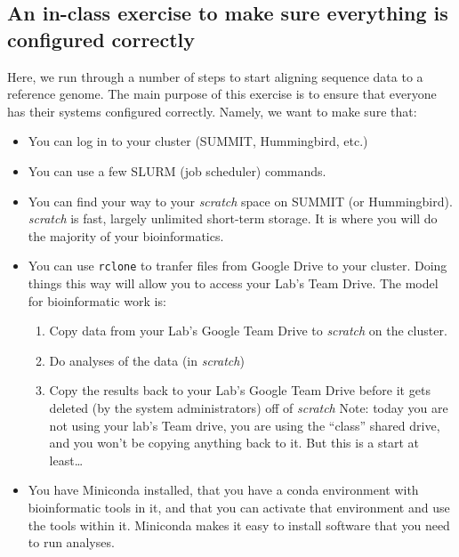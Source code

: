 \documentclass[]{krantz}
\providecommand{\tightlist}{%
  \setlength{\itemsep}{0pt}\setlength{\parskip}{0pt}}
\begin{document}
\hypertarget{an-in-class-exercise-to-make-sure-everything-is-configured-correctly}{%
\subsection{An in-class exercise to make sure everything is configured correctly}\label{an-in-class-exercise-to-make-sure-everything-is-configured-correctly}}

Here, we run through a number of steps to start aligning sequence data to a reference
genome. The main purpose of this exercise is to ensure that everyone has their systems
configured correctly. Namely, we want to make sure that:

\begin{itemize}
\tightlist
\item
  You can log in to your cluster (SUMMIT, Hummingbird, etc.)
\item
  You can use a few SLURM (job scheduler) commands.
\item
  You can find your way to your \emph{scratch} space on SUMMIT (or Hummingbird). \emph{scratch} is fast, largely
  unlimited short-term storage. It is where you will do the majority of your bioinformatics.
\item
  You can use \texttt{rclone} to tranfer files from Google Drive to your cluster. Doing things this way will allow
  you to access your Lab's Team Drive. The model for bioinformatic work is:

  \begin{enumerate}
  \def\labelenumi{\alph{enumi}.}
  \tightlist
  \item
    Copy data from your Lab's Google Team Drive to \emph{scratch} on the cluster.
  \item
    Do analyses of the data (in \emph{scratch})
  \item
    Copy the results back to your Lab's Google Team Drive before it gets deleted (by the system administrators)
    off of \emph{scratch}
    Note: today you are not using your lab's Team drive, you are using the ``class'' shared drive,
    and you won't be copying anything back to it. But this is a start at least\ldots{}
  \end{enumerate}
\item
  You have Miniconda installed, that you have a conda environment with bioinformatic
  tools in it, and that you can activate that environment and use the tools within it.
  Miniconda makes it easy to install software that you need to run analyses.
\end{itemize}
\end{document}
